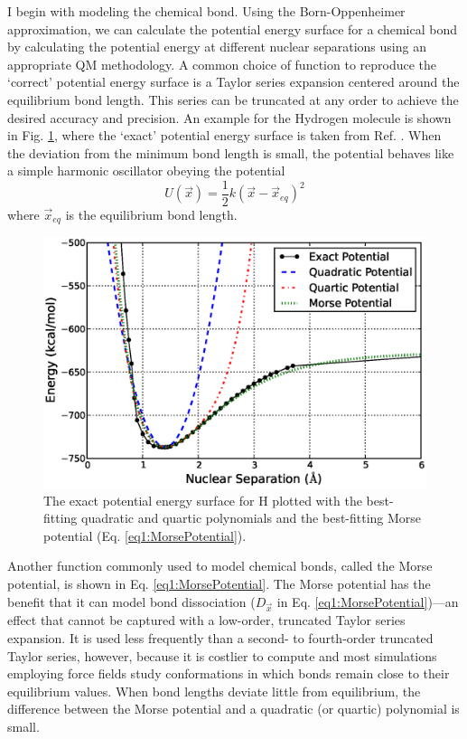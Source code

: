 I begin with modeling the chemical bond. Using the Born-Oppenheimer
approximation, we can calculate the potential energy surface for a chemical bond
by calculating the potential energy at different nuclear separations using an
appropriate QM methodology. A common choice of function to reproduce the
`correct' potential energy surface is a Taylor series expansion centered around
the equilibrium bond length. This series can be truncated at any order to
achieve the desired accuracy and precision.  An example for the Hydrogen
molecule is shown in Fig.  \ref{fig1:HydrogenMoleculeBond}, where the `exact'
potential energy surface is taken from Ref. . When the
deviation from the minimum bond length is small, the potential behaves like a
simple harmonic oscillator obeying the potential
\begin{equation}
   U(\vec{x}) = \frac 1 2 k (\vec{x} - \vec{x}_{eq}) ^ 2
   \label{eq1:HarmonicOscillator}
\end{equation}
where $\vec{x}_{eq}$ is the equilibrium bond length.

\begin{figure}
   \includegraphics[width=6.5in]{HydrogenMoleculeBond.ps}
   \caption{The exact potential energy surface for H \cite{Kolos1964}
            plotted with the best-fitting quadratic and quartic polynomials and
            the best-fitting Morse potential (Eq. \ref{eq1:MorsePotential}).}
   \label{fig1:HydrogenMoleculeBond}
\end{figure}

Another function commonly used to model chemical bonds, called the Morse
potential, is shown in Eq. \ref{eq1:MorsePotential}. The Morse potential has the
benefit that it can model bond dissociation ($D_{\vec{x}}$ in Eq.
\ref{eq1:MorsePotential})---an effect that cannot be captured with a low-order,
truncated Taylor series expansion. It is used less frequently than a second- to
fourth-order truncated Taylor series, however, because it is costlier to compute
and most simulations employing force fields study conformations in which bonds
remain close to their equilibrium values. When bond lengths deviate little from
equilibrium, the difference between the Morse potential and a quadratic (or
quartic) polynomial is small. \cite{Cramer_Book_EssentialsCompChem_2004}

